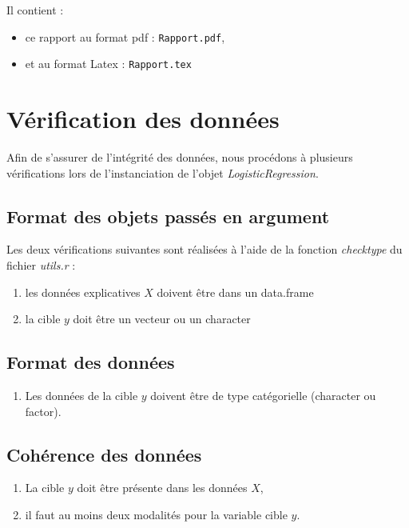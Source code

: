 \documentclass[10pt,french]{report}
\begin{document}
	Il contient :
	\begin{itemize}
		\item ce rapport au format pdf : \texttt{Rapport.pdf},
		\item et au format Latex : \texttt{Rapport.tex}
	\end{itemize}
	
	\section{Vérification des données}
	Afin de s'assurer de l'intégrité des données, nous procédons à plusieurs vérifications lors de l'instanciation de l'objet \textit{LogisticRegression}.
	
	\subsection{Format des objets passés en argument}
	
	Les deux vérifications suivantes sont réalisées à l'aide de la fonction \textit{check\textunderscore type} du fichier \textit{utils.r} :
	
	\begin{enumerate}
		\item les données explicatives $X$ doivent être dans un data.frame
		\item la cible $y$ doit être un vecteur ou un character
	\end{enumerate}

	\subsection{Format des données}
	
	\begin{enumerate}
		\item Les données de la cible $y$ doivent être de type catégorielle (character ou factor).
	\end{enumerate}
	
	\subsection{Cohérence des données}
	
	\begin{enumerate}
		\item La cible $y$ doit être présente dans les données $X$,
		\item il faut au moins deux modalités pour la variable cible $y$.
	\end{enumerate}
	
\end{document}

